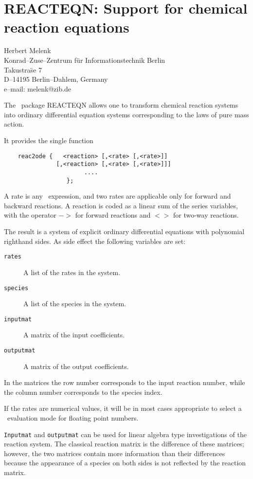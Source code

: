 \chapter[REACTEQN: Chemical reaction equations]%
	{REACTEQN: Support for chemical reaction equations}
\label{REACTEQN}

{\footnotesize
\begin{center}
Herbert Melenk \\
Konrad--Zuse--Zentrum f\"ur Informationstechnik Berlin \\
Takustra\"se 7 \\
D--14195 Berlin--Dahlem, Germany \\[0.05in]
e--mail: melenk@zib.de
\end{center}
}

The \REDUCE\ package REACTEQN allows one to transform chemical reaction
systems into ordinary differential equation systems corresponding to
the laws of pure mass action.

It provides the single function

\begin{verbatim}
    reac2ode {   <reaction> [,<rate> [,<rate>]]
               [,<reaction> [,<rate> [,<rate>]]]
                       ....
                  };
\end{verbatim}

A rate is any \REDUCE\ expression, and two rates are applicable only
for forward and backward reactions.  A reaction is coded as a linear
sum of the series variables, with the operator $->$ for forward
reactions and $<>$ for two-way reactions.

The result is a system of explicit ordinary differential equations
with polynomial righthand sides.  As side effect the following
variables are set:
\newpage
\begin{description}
\item[{\tt rates}]
 A list of the rates in the system.
\item[{\tt species}]
 A list of the species in the system.
\item[{\tt inputmat}]
 A matrix of the input coefficients.
\item[{\tt outputmat}]
 A matrix of the output coefficients.
\end{description}

In the matrices the row number corresponds to the input reaction
number, while the column number corresponds to the species index.

If the rates are numerical values, it will be in most cases
appropriate to select a \REDUCE\ evaluation mode for floating point numbers.

{\tt Inputmat} and {\tt outputmat} can be used for linear algebra type
investigations of the reaction system.  The classical reaction
matrix is the difference of these matrices; however, the two
matrices contain more information than their differences because
the appearance of a species on both sides is not reflected by
the reaction matrix.

